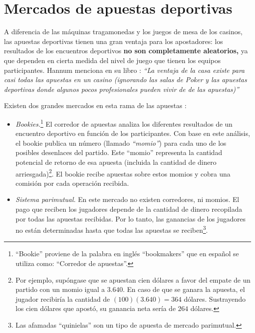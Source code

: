  \section{Mercados de apuestas deportivas}
 \label{sec:apuestasd-deportivas}
 
 A diferencia de las máquinas tragamonedas y los juegos de mesa de los casinos, las apuestas deportivas tienen una gran ventaja para los apostadores: los resultados de los encuentros deportivos \textbf{no son completamente aleatorios,} ya que dependen en cierta medida del nivel de juego que tienen los equipos participantes. Hannum menciona en su libro \cite{hannum2005practical} : \emph{``La ventaja de la casa existe para casi todas las apuestas en un casino (ignorando las salas de Poker y las apuestas deportivas donde algunos pocos profesionales pueden vivir de de las apuestas)''}

 Existen dos grandes mercados en esta rama de las apuestas \cite{chung2010empirical}:
 \begin{itemize} 
 	\item \emph{Bookies.}\footnote{``Bookie'' proviene de la palabra en inglés ``bookmakers'' que en español se utiliza como: ``Corredor de apuestas''.} El corredor de apuestas analiza los diferentes resultados de un encuentro deportivo en función de los participantes. Con base en este análisis, el bookie publica un número (llamado \emph{``momio''}) para cada uno de los posibles desenlaces del partido. Este ``momio'' representa la cantidad potencial de retorno de esa apuesta (incluida la cantidad de dinero arriesgada)\footnote{Por ejemplo, supóngase que se apuestan cien dólares a favor del empate de un partido con un momio igual a $3.640$. En caso de que se ganara la apuesta, el jugador recibiría la cantidad de $(100)(3.640) = 364$ dólares. Sustrayendo los cien dólares que apostó, su ganancia neta sería de $264$ dólares.}. El bookie recibe apuestas sobre estos momios y cobra una comisión por cada operación recibida. 
 	\item \emph{Sistema parimutual.} En este mercado no existen  corredores, ni momios. El pago que reciben los jugadores depende de la cantidad de dinero recopilada por todas las apuestas recibidas. Por lo tanto, las ganancias de los jugadores no están determinadas hasta que todas las apuestas se reciben\footnote{Las afamadas ``quinielas'' son un tipo de apuesta de mercado parimutual.}.
 	\end{itemize}

